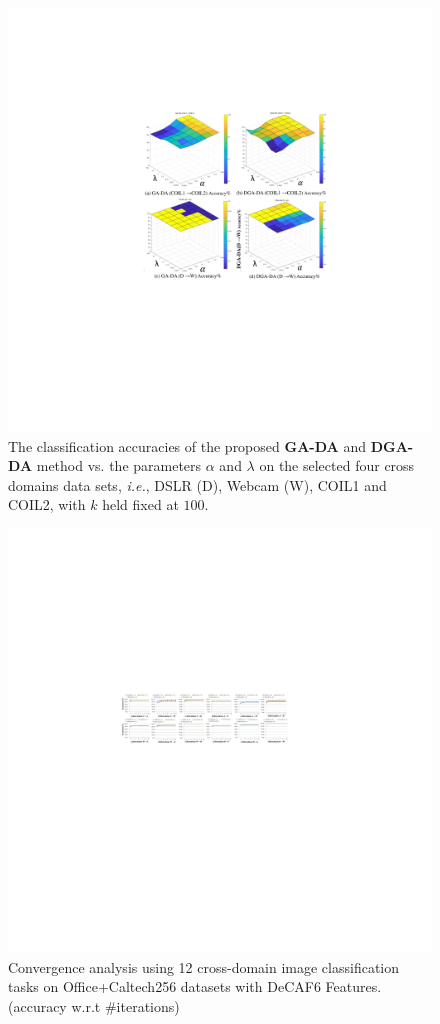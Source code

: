 \documentclass[journal,twocolumn]{IEEEtran}
\begin{document}
\begin{CJK*}{UTF8}{gkai}
\begin{figure}[h!]
	\centering
	\includegraphics[width=0.9\linewidth]{parameter.pdf}
	\caption {The classification accuracies of the proposed \textbf{GA-DA} and \textbf{DGA-DA} method vs. the parameters $\alpha $ and $\lambda $ on the selected four cross domains data sets, \textit{i.e.}, DSLR (D), Webcam (W), COIL1 and COIL2, with $k$ held fixed at $100$. } 
    	\label{fig:para}
\end{figure} 



\begin{figure}[h!]
	\centering
	\includegraphics[width=0.94\linewidth]{iteration.pdf}
	\caption {Convergence analysis using 12 cross-domain image classification tasks on Office+Caltech256 datasets with DeCAF6 Features. (accuracy w.r.t $\#$iterations) } 
    	\label{fig:accITER}
\end{figure} 




\end{CJK*}
\end{document}

